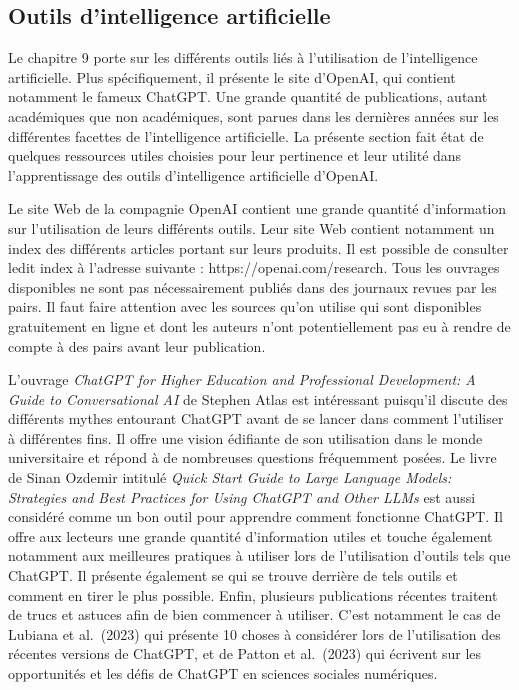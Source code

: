 \documentclass[
  letterpaper,
]{scrbook}
\begin{document}
\hypertarget{outils-dintelligence-artificielle-1}{%
\subsection{Outils d'intelligence
artificielle}\label{outils-dintelligence-artificielle-1}}

Le chapitre 9 porte sur les différents outils liés à l'utilisation de
l'intelligence artificielle. Plus spécifiquement, il présente le site
d'OpenAI, qui contient notamment le fameux ChatGPT. Une grande quantité
de publications, autant académiques que non académiques, sont parues
dans les dernières années sur les différentes facettes de l'intelligence
artificielle. La présente section fait état de quelques ressources
utiles choisies pour leur pertinence et leur utilité dans
l'apprentissage des outils d'intelligence artificielle d'OpenAI.

Le site Web de la compagnie OpenAI contient une grande quantité
d'information sur l'utilisation de leurs différents outils. Leur site
Web contient notamment un index des différents articles portant sur
leurs produits. Il est possible de consulter ledit index à l'adresse
suivante : https://openai.com/research. Tous les ouvrages disponibles ne
sont pas nécessairement publiés dans des journaux revues par les pairs.
Il faut faire attention avec les sources qu'on utilise qui sont
disponibles gratuitement en ligne et dont les auteurs n'ont
potentiellement pas eu à rendre de compte à des pairs avant leur
publication.

L'ouvrage \emph{ChatGPT for Higher Education and Professional
Development: A Guide to Conversational AI} de Stephen Atlas est
intéressant puisqu'il discute des différents mythes entourant ChatGPT
avant de se lancer dans comment l'utiliser à différentes fins. Il offre
une vision édifiante de son utilisation dans le monde universitaire et
répond à de nombreuses questions fréquemment posées. Le livre de Sinan
Ozdemir intitulé \emph{Quick Start Guide to Large Language Models:
Strategies and Best Practices for Using ChatGPT and Other LLMs} est
aussi considéré comme un bon outil pour apprendre comment fonctionne
ChatGPT. Il offre aux lecteurs une grande quantité d'information utiles
et touche également notamment aux meilleures pratiques à utiliser lors
de l'utilisation d'outils tels que ChatGPT. Il présente également se qui
se trouve derrière de tels outils et comment en tirer le plus possible.
Enfin, plusieurs publications récentes traitent de trucs et astuces afin
de bien commencer à utiliser. C'est notamment le cas de Lubiana et
al.~(2023) qui présente 10 choses à considérer lors de l'utilisation des
récentes versions de ChatGPT, et de Patton et al.~(2023) qui écrivent
sur les opportunités et les défis de ChatGPT en sciences sociales
numériques.
\end{document}
